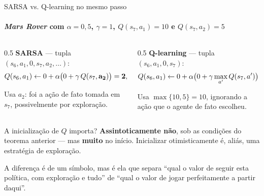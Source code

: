\documentclass[aspectratio=169, 11pt]{beamer}
\begin{document}
\begin{frame}{SARSA {\normalfont vs.} Q-learning no mesmo passo}
  \framesubtitle{\emph{Mars Rover} com $\alpha = 0{,}5$, $\gamma = 1$, $Q(s_7,a_1) = 10$ e $Q(s_7,a_2) = 5$}

  \begin{columns}[T]
    \begin{column}{0.5\textwidth}
      \textbf{SARSA} --- tupla $(s_6, a_1, 0, s_7, a_2, \dots)$:
      \vspace{-0.4em}
      \[ \small Q(s_6,a_1) \leftarrow 0 + \alpha\bigl(0 + \gamma\, Q(s_7,\mathbf{a_2})\bigr) = \mathbf{2{,}5} \]
      \vspace{-1.4em}

      {\footnotesize Usa $a_2$: foi a ação de fato tomada em $s_7$,
      possivelmente por exploração.}
    \end{column}
    \begin{column}{0.5\textwidth}
      \textbf{Q-learning} --- tupla $(s_6, a_1, 0, s_7)$:
      \vspace{-0.4em}
      \[ \small Q(s_6,a_1) \leftarrow 0 + \alpha\bigl(0 + \gamma \max_{a'} Q(s_7,a')\bigr) = \mathbf{5} \]
      \vspace{-1.4em}

      {\footnotesize Usa $\max\{10,5\} = 10$, ignorando a ação que o agente
      de fato escolheu.}
    \end{column}
  \end{columns}

  \begin{alertabox}
    A inicialização de $Q$ importa? \textbf{Assintoticamente não}, sob as
    condições do teorema anterior --- mas \textbf{muito} no início.
    Inicializar otimisticamente é, aliás, uma estratégia de exploração.
  \end{alertabox}

  \begin{ideiabox}
    A diferença é de um símbolo, mas é ela que separa ``qual o valor de
    seguir esta política, com exploração e tudo'' de ``qual o valor de
    jogar perfeitamente a partir daqui''.
  \end{ideiabox}
\end{frame}
\end{document}
